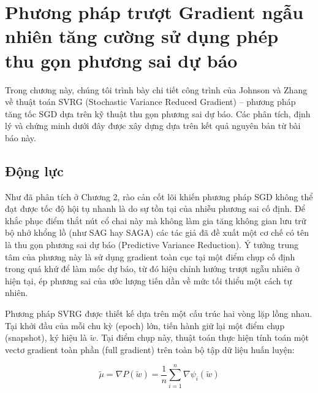 \chapter{Phương pháp trượt Gradient ngẫu nhiên tăng cường sử dụng phép thu gọn phương sai dự báo}



Trong chương này, chúng tôi trình bày chi tiết công trình của Johnson và Zhang \cite{johnson2013accelerating} về thuật toán SVRG (Stochastic Variance Reduced Gradient) – phương pháp tăng tốc SGD dựa trên kỹ thuật thu gọn phương sai dự báo. Các phân tích, định lý và chứng minh dưới đây được xây dựng dựa trên kết quả nguyên bản từ bài báo này.



\section{Động lực}



Như đã phân tích ở Chương 2, rào cản cốt lõi khiến phương pháp SGD không thể đạt được tốc độ hội tụ nhanh là do sự tồn tại của nhiễu phương sai cố định. Để khắc phục điểm thắt nút cổ chai này mà không làm gia tăng không gian lưu trữ bộ nhớ khổng lồ (như SAG hay SAGA) các tác giả \cite{johnson2013accelerating} đã đề xuất một cơ chế có tên là thu gọn phương sai dự báo (Predictive Variance Reduction). Ý tưởng trung tâm của phương này là sử dụng gradient toàn cục tại một điểm chụp cố định trong quá khứ để làm mốc dự báo, từ đó hiệu chỉnh hướng trượt ngẫu nhiên ở hiện tại, ép phương sai của ước lượng tiến dần về mức tối thiểu một cách tự nhiên.






Phương pháp SVRG được thiết kế dựa trên một cấu trúc hai vòng lặp lồng nhau. Tại khởi đầu của mỗi chu kỳ (epoch) lớn, tiến hành giữ lại một điểm chụp (snapshot), ký hiệu là $\tilde{w}$. Tại điểm chụp này, thuật toán thực hiện tính toán một vectơ gradient toàn phần (full gradient) trên toàn bộ tập dữ liệu huấn luyện:

\begin{equation}
\tilde{\mu} = \nabla P(\tilde{w}) = \frac{1}{n} \sum_{i=1}^n \nabla \psi_i(\tilde{w})
\end{equation}

